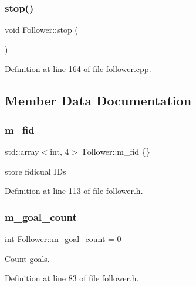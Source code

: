 \subsubsection{\texorpdfstring{stop()}{stop()}}
{\footnotesize\ttfamily void Follower\+::stop (\begin{DoxyParamCaption}{ }\end{DoxyParamCaption})}



Definition at line 164 of file follower.\+cpp.



\subsection{Member Data Documentation}
\mbox{\label{class_follower_a350054bbd7659d493cccc4b4ad9bc460}} 
\subsubsection{\texorpdfstring{m\+\_\+fid}{m\_fid}}
{\footnotesize\ttfamily std\+::array$<$int, 4$>$ Follower\+::m\+\_\+fid \{\}}



store fidicual I\+Ds 



Definition at line 113 of file follower.\+h.

\mbox{\label{class_follower_af53c7dcd8b5a99111bdfe0c8dd2015cf}} 
\subsubsection{\texorpdfstring{m\+\_\+goal\+\_\+count}{m\_goal\_count}}
{\footnotesize\ttfamily int Follower\+::m\+\_\+goal\+\_\+count = 0}



Count goals. 



Definition at line 83 of file follower.\+h.

\mbox{\label{class_follower_a6d4e1ebbe79cc8af601d53cba7aeb30a}} 
